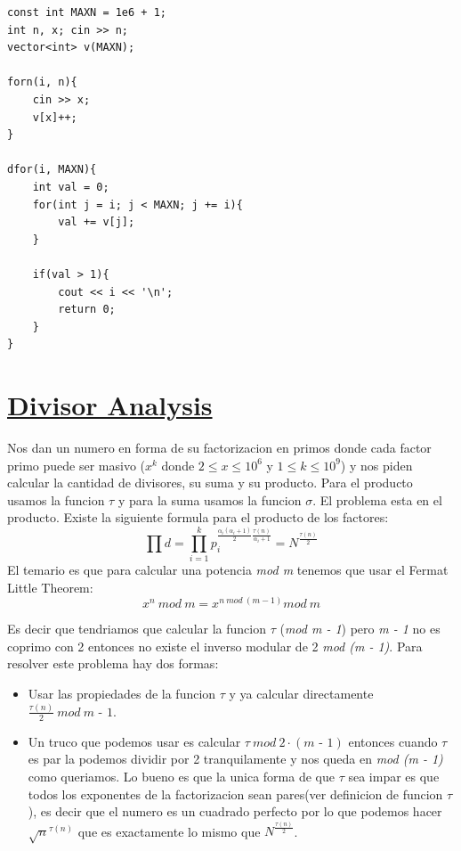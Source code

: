 \documentclass{article}
\begin{document}
\begin{lstlisting}[caption=Solucion de la segunda forma]
const int MAXN = 1e6 + 1;
int n, x; cin >> n;
vector<int> v(MAXN);

forn(i, n){
    cin >> x; 
    v[x]++;
}

dfor(i, MAXN){
    int val = 0;
    for(int j = i; j < MAXN; j += i){
        val += v[j];
    }

    if(val > 1){
        cout << i << '\n';
        return 0;
    }
}
\end{lstlisting}

\section{\href{https://cses.fi/problemset/task/2182}{Divisor Analysis}}
Nos dan un numero en forma de su factorizacion en primos donde cada factor primo puede ser masivo ($x^k$ donde $2 \leq x \leq 10^6$ y $1 \leq k \leq 10^9$) y nos piden calcular la cantidad de divisores, su suma y su producto.
\indent Para el producto usamos la funcion $\tau$ y para la suma usamos la funcion $\sigma$. El problema esta en el producto. Existe la siguiente formula para el producto de los factores:
\[
\prod d = \prod_{i = 1}^{k} p_i^{\frac{\alpha_i (\alpha_i + 1)}{2} \frac{\tau (n)}{\alpha_i + 1}} = N^{\frac{\tau(n)}{2}}
\]
El temario es que para calcular una potencia \textit{mod m} tenemos que usar el Fermat Little Theorem:
\[
x^n \: mod \: \textit{m} = x^{n \: mod \: (m - 1)} mod \: \textit{m}
\]

Es decir que tendriamos que calcular la funcion $\tau$ (\textit{mod m - 1}) pero \textit{m - 1} no es coprimo con 2 entonces no existe el inverso modular de 2 \textit{mod (m - 1)}. Para resolver este problema hay dos formas:
\begin{itemize}
    \item Usar las propiedades de la funcion $\tau$ y ya calcular directamente $\frac{\tau(n)}{2} \: mod \: \textit{m - 1}$.
    \item Un truco que podemos usar es calcular $\tau \: mod \: 2 \cdot (\textit{m - 1})$ entonces cuando $\tau$ es par la podemos dividir por 2 tranquilamente y nos queda en \textit{mod (m - 1)} como queriamos. Lo bueno es que la unica forma de que $\tau$ sea impar es que todos los exponentes de la factorizacion sean pares(ver definicion de funcion $\tau$), es decir que el numero es un cuadrado perfecto por lo que podemos hacer $\sqrt{n}^{\tau(n)}$ que es exactamente lo mismo que $N^{\frac{\tau(n)}{2}}$.
\end{itemize}
\end{document}
